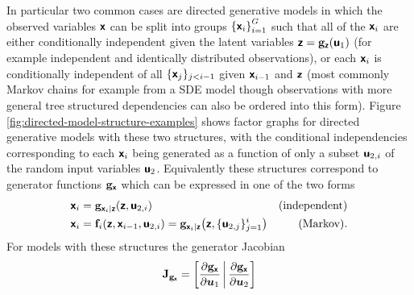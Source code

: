 In particular two common cases are directed generative models in which the observed variables $\boldsymbol{\mathsf{x}}$ can be split into groups $\fset{\rvct{x}_i}_{i=1}^G$ such that all of the $\boldsymbol{\mathsf{x}}_i$ are either conditionally independent given the latent variables $\boldsymbol{\mathsf{z}} = {\mathbf{g}}_{\boldsymbol{\mathsf{z}}}(\boldsymbol{\mathsf{u}}_1)$ (for example independent and identically distributed observations), or each $\boldsymbol{\mathsf{x}}_i$ is conditionally independent of all $\lbrace \boldsymbol{\mathsf{x}}_j \rbrace_{j<i-1}$ given $\boldsymbol{\mathsf{x}}_{i-1}$ and $\boldsymbol{\mathsf{z}}$ (most commonly Markov chains for example from a \ac{SDE} model though observations with more general tree structured dependencies can also be ordered into this form). Figure \ref{fig:directed-model-structure-examples} shows factor graphs for directed generative models with these two structures, with the conditional independencies corresponding to each $\boldsymbol{\mathsf{x}}_i$ being generated as a function of only a subset $\boldsymbol{\mathsf{u}}_{2,i}$ of the random input variables $\boldsymbol{\mathsf{u}}_2$. Equivalently these structures correspond to generator functions ${\mathbf{g}}_{\boldsymbol{\mathsf{x}}}$ which can be expressed in one of the two forms
\begin{align}\label{eq:elem_autoreg_model_struct}
    \rvct{x}_i &= \genfunc_{\rvct{x}_i|\rvct{z}}(\rvct{z}, \rvct{u}_{2,i})
    & \text{(independent)}\\
    \rvct{x}_{i} 
    &=
    \vctfunc{f}_i\lpa\rvct{z}, \rvct{x}_{i-1}, \rvct{u}_{2,i}\rpa = 
    \genfunc_{\rvct{x}_i|\rvct{z}}\lpa\rvct{z}, \lbrace\rvct{u}_{2,j}\rbrace^i_{j=1}\rpa & \text{(Markov).}
\end{align}
For models with these structures the generator Jacobian
\begin{equation}
  \jacobian{\genfunc_{\rvct{x}}} =
  \lsb
   \pd{\genfunc_{\rvct{x}}}{\vct{u}_1} \,\middle|\,
   \pd{\genfunc_{\rvct{x}}}{\vct{u}_2}
  \rsb
\end{equation}
